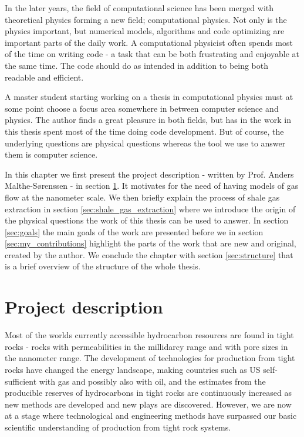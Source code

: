 In the later years, the field of computational science has been merged with theoretical physics forming a new field; computational physics. Not only is the physics important, but numerical models, algorithms and code optimizing are important parts of the daily work. A computational physicist often spends most of the time on writing code - a task that can be both frustrating and enjoyable at the same time. The code should do as intended in addition to being both readable and efficient.

A master student starting working on a thesis in computational physics must at some point choose a focus area somewhere in between computer science and physics. The author finds a great pleasure in both fields, but has in the work in this thesis spent most of the time doing code development. But of course, the underlying questions are physical questions whereas the tool we use to answer them is computer science.

In this chapter we first present the project description - written by Prof. Anders Malthe-S{\o}renssen - in section \ref{sec:project_description}. It motivates for the need of having models of gas flow at the nanometer scale. We then briefly explain the process of shale gas extraction in section \ref{sec:shale_gas_extraction} where we introduce the origin of the physical questions the work of this thesis can be used to answer. In section \ref{sec:goals} the main goals of the work are presented before we in section \ref{sec:my_contributions} highlight the parts of the work that are new and original, created by the author. We conclude the chapter with section \ref{sec:structure} that is a brief overview of the structure of the whole thesis.

\section{Project description}
\label{sec:project_description}
Most of the worlds currently accessible hydrocarbon resources are found in tight rocks - rocks with permeabilities in the millidarcy range and with pore sizes in the nanometer range. The development of technologies for production from tight rocks have changed the energy landscape, making countries such as US self-sufficient with gas and possibly also with oil, and the estimates from the producible reserves of hydrocarbons in tight rocks are continuously increased as new methods are developed and new plays are discovered. However, we are now at a stage where technological and engineering methods have surpassed our basic scientific understanding of production from tight rock systems.

